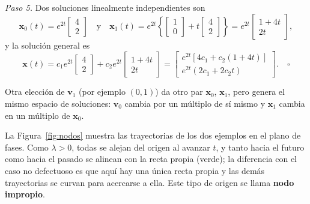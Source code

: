 \begin{example}
\emph{Paso 5.} Dos soluciones linealmente independientes son
\[
\mathbf{x}_0(t) = e^{2t} \begin{bmatrix} 4 \\ 2 \end{bmatrix} \quad \text{y} \quad \mathbf{x}_1(t) = e^{2t} \left\{ \begin{bmatrix} 1 \\ 0 \end{bmatrix} + t \begin{bmatrix} 4 \\ 2 \end{bmatrix} \right\} = e^{2t} \begin{bmatrix} 1 + 4t \\ 2t \end{bmatrix},
\]
y la soluci\'on general es
\[
\mathbf{x}(t) = c_1 e^{2t} \begin{bmatrix} 4 \\ 2 \end{bmatrix} + c_2 e^{2t} \begin{bmatrix} 1 + 4t \\ 2t \end{bmatrix} = \begin{bmatrix} e^{2t}[4c_1 + c_2(1 + 4t)] \\ e^{2t}(2c_1 + 2c_2t) \end{bmatrix}. \quad \square
\]
\end{example}

\begin{note}
Otra elecci\'on de $\mathbf v_1$ (por ejemplo $(0,1)$) da otro par $\mathbf x_0$, $\mathbf x_1$, pero genera el mismo espacio de soluciones: $\mathbf v_0$ cambia por un m\'ultiplo de s\'i mismo y $\mathbf x_1$ cambia en un m\'ultiplo de $\mathbf x_0$.
\end{note}

La Figura~\ref{fig:nodos} muestra las trayectorias de los dos ejemplos en el plano de fases. Como $\lambda>0$, todas se alejan del origen al avanzar $t$, y tanto hacia el futuro como hacia el pasado se alinean con la recta propia (verde); la diferencia con el caso no defectuoso es que aqu\'i hay una \'unica recta propia y las dem\'as trayectorias se curvan para acercarse a ella. Este tipo de origen se llama \textbf{nodo impropio}.

